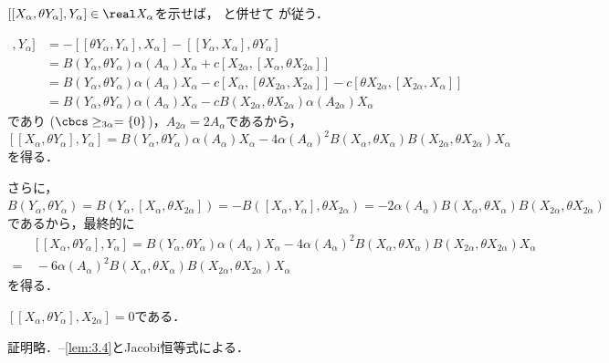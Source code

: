 \begin{pfwn}{}

  $[[X_{\alpha}, \theta Y_{\alpha}], Y_{\alpha}]  \in \real X_{\alpha} $を示せば， と併せて  が従う．

  
  \begin{align*}
    [[X_{\alpha}, \theta Y_{\alpha}], Y_{\alpha}] &= -[[\theta Y_{\alpha}, Y_{\alpha}], X_{\alpha}] - [[Y_{\alpha}, X_{\alpha}], \theta Y_{\alpha}] \\
                                                  &= B(Y_{\alpha}, \theta Y_{\alpha})\alpha(A_{\alpha})X_{\alpha} +c[X_{2\alpha},[X_{\alpha}, \theta X_{2\alpha}]] \\
                                                  &= B(Y_{\alpha}, \theta Y_{\alpha})\alpha(A_{\alpha})X_{\alpha} - c[X_{\alpha}, [\theta X_{2\alpha}, X_{2\alpha}]] - c[\theta X_{2\alpha},[X_{2\alpha},X_{\alpha}]] \\
                                                  &= B(Y_{\alpha}, \theta Y_{\alpha})\alpha(A_{\alpha})X_{\alpha} - cB(X_{2\alpha},\theta X_{2\alpha})\alpha(A_{2\alpha})X_{\alpha}
  \end{align*}
  であり ($\cbcs \ge_{3\alpha} = \{0\} $)，$A_{2\alpha} = 2A_{\alpha} $であるから，\\
  $[[X_{\alpha}, \theta Y_{\alpha}], Y_{\alpha}] =  B(Y_{\alpha}, \theta Y_{\alpha})\alpha(A_{\alpha})X_{\alpha} - 4\alpha(A_{\alpha})^2B(X_{\alpha}, \theta X_{\alpha})B(X_{2\alpha}, \theta X_{2\alpha})X_{\alpha} $を得る．

さらに，$B(Y_{\alpha}, \theta Y_{\alpha}) = B(Y_{\alpha},[X_{\alpha}, \theta X_{2\alpha}]) = -B([X_{\alpha}, Y_{\alpha}], \theta X_{2\alpha}) = -2\alpha(A_{\alpha})B(X_{\alpha},\theta X_{\alpha})B(X_{2\alpha}, \theta X_{2\alpha})  $であるから，最終的に
\begin{align*}
  &[[X_{\alpha}, \theta Y_{\alpha}], Y_{\alpha}] =  B(Y_{\alpha}, \theta Y_{\alpha})\alpha(A_{\alpha})X_{\alpha} - 4\alpha(A_{\alpha})^2B(X_{\alpha}, \theta X_{\alpha})B(X_{2\alpha}, \theta X_{2\alpha})X_{\alpha} \\
  =&\ -6\alpha(A_{\alpha})^2B(X_{\alpha}, \theta X_{\alpha})B(X_{2\alpha}, \theta X_{2\alpha})X_{\alpha}
\end{align*}
を得る．
  
\end{pfwn}

\begin{lem}\label{lem:3.5}
  $[[X_{\alpha}, \theta Y_{\alpha}], X_{2\alpha}] = 0$である．

  証明略．--\ref{lem:3.4}とJacobi恒等式による．
\end{lem}

